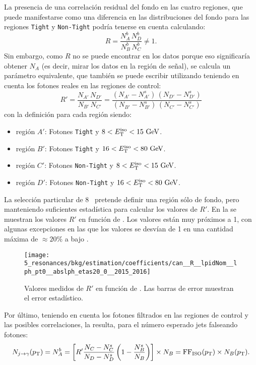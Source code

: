 La presencia de una correlación residual del fondo en las cuatro regiones, que puede manifestarse como una diferencia en las distribuciones del fondo para las regiones \texttt{Tight} y \texttt{Non-Tight} podría tenerse en cuenta calculando:
\begin{equation*}
    R = \frac{N^{b}_{A}\,N^{b}_{D}}{N^{b}_{B}\,N^{b}_{C}} \neq 1.
\end{equation*}
Sin embargo, como \(R\) no se puede encontrar en los datos porque eso significaría obtener \(N_A\) (es decir, mirar los datos en la región de se\~nal), se calcula un parámetro equivalente, que también se puede escribir utilizando teniendo en cuenta los fotones reales en las regiones de control:
\begin{equation*}
    R' = \frac{N_{A'}\,N_{D'}}{N_{B'}\,N_{C'}} = \frac{(N_{A'} - N^{s}_{A'})\,(N_{D'}-N^s_{D'})}{(N_{B'}-N^s_{B'})\,(N_{C'}-N^s_{C'})}
\end{equation*}
con la definición para cada región siendo:
\begin{itemize}
    \item región \(A'\): Fotones \texttt{Tight} y \(8 < E_{\text{T}}^{\text{iso}} < 15~ \text{GeV}\).
    \item región \(B'\): Fotones \texttt{Tight} y \(16 < E_{\text{T}}^{\text{iso}} < 80~ \text{GeV}\).
    \item región \(C'\): Fotones \texttt{Non-Tight} y \(8 < E_{\text{T}}^{\text{iso}} < 15~ \text{GeV}\).
    \item región \(D'\): Fotones \texttt{Non-Tight} y \(16 < E_{\text{T}}^{\text{iso}} < 80~ \text{GeV}\).
\end{itemize}
La selección particular de 8 \gev\ pretende definir una región sólo de fondo, pero manteniendo suficientes estadística para calcular los valores de \(R'\). En la \Fig{\ref{fig:bkg:estimation:abcd_corrections:rprime}} se muestran los valores \(R'\) en función de \ptgam.
Los valores están muy próximos a 1, con algunas excepciones en las que los valores se desvían de 1 en una cantidad máxima de \(\approx 20\%\) a bajo \ptgam.
\begin{figure}[htbp]
    \centering
    \texttt{[image: 5\_resonances/bkg/estimation/coefficients/can\_\_R\_\_lpidNom\_\_lph\_pt0\_\_abslph\_etas20\_0\_\_2015\_2016]}
    \caption{Valores medidos de \(R'\) en función de \ptgam. Las barras de error muestran el error estadístico.}
    \label{fig:bkg:estimation:abcd_corrections:rprime}
\end{figure}

Por último, teniendo en cuenta los fotones filtrados en las regiones de control y las posibles correlaciones, la \Eqn{\ref{eq:bkg:estimation:abcd_corrections:njfakes_leak}} resulta, para el número esperado jets falseando fotones:
\begin{equation}
    \label{eq:bkg:estimation:abcd_corrections_ffiso}
    N_{j\rightarrow\gamma}(p_{\text{T}}) =
    N^{b}_{A} =
    \left[R'  \frac{N_{C}-N^{s}_{C}}{N_{D}-N^{s}_{D}}  \left(1 - \frac{N^{s}_{B}}{N_{B}} \right)\right] \times N_B = \text{FF}_{\text{ISO}}(p_{\text{T}})  \times  N_{B}(p_{\text{T}}).
\end{equation}






